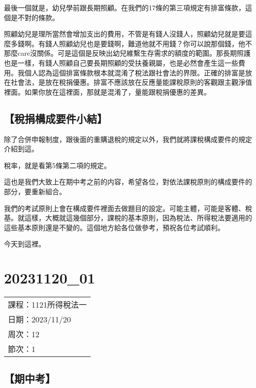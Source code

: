 \documentclass[]{ctexbook}
\begin{document}
最後一個就是，幼兒學前跟長期照顧。在我們的17條的第三項規定有排富條款，這個是不對的條款。

照顧幼兒是理所當然會增加支出的費用，不管是有錢人沒錢人，照顧幼兒就是要這麼多錢啊。有錢人照顧幼兒也是要錢啊，難道他就不用錢？你可以說那個錢，他不那麼care沒關係。可是這個是反映出幼兒維繫生存需求的額度的範圍。那長期照護也是一樣，有錢人照顧自己要長期照顧的受扶養親屬，也是必然會產生這一些費用。我個人認為這個排富條款根本就混淆了稅法跟社會法的界限。正確的排富是放在社會法，是放在稅捐優惠。排富不應該放在反應量能課稅原則的客觀跟主觀淨值裡面。如果你放在這裡面，那就是混淆了，量能跟稅捐優惠的差異。

\hypertarget{ux7a05ux6350ux69cbux6210ux8981ux4ef6ux5c0fux7d50}{%
\section{【稅捐構成要件小結】}\label{ux7a05ux6350ux69cbux6210ux8981ux4ef6ux5c0fux7d50}}

除了合併申報制度，跟後面的重購退稅的規定以外，我們就將課稅構成要件的規定介紹到這。

稅率，就是看第5條第二項的規定。

這也是我們大致上在期中考之前的内容，希望各位，對依法課稅原則的構成要件的部分，要重新組合。

我們的考試原則上會在構成要件裡面去做題目的設定。可能主體，可能是客體、稅基。就這樣，大概就這幾個部分，課稅的基本原則，因為稅法、所得稅法要適用的這些基本原則還是不變的。這個地方給各位做參考，預祝各位考試順利。

今天到這裡。

\hypertarget{section-21}{%
\chapter{20231120\_01}\label{section-21}}

\begin{longtable}[]{@{}l@{}}
\toprule()
\endhead
課程：1121所得稅法一 \\
日期：2023/11/20 \\
周次：12 \\
節次：1 \\
\bottomrule()
\end{longtable}

\hypertarget{ux671fux4e2dux8003}{%
\section{【期中考】}\label{ux671fux4e2dux8003}}
\end{document}
